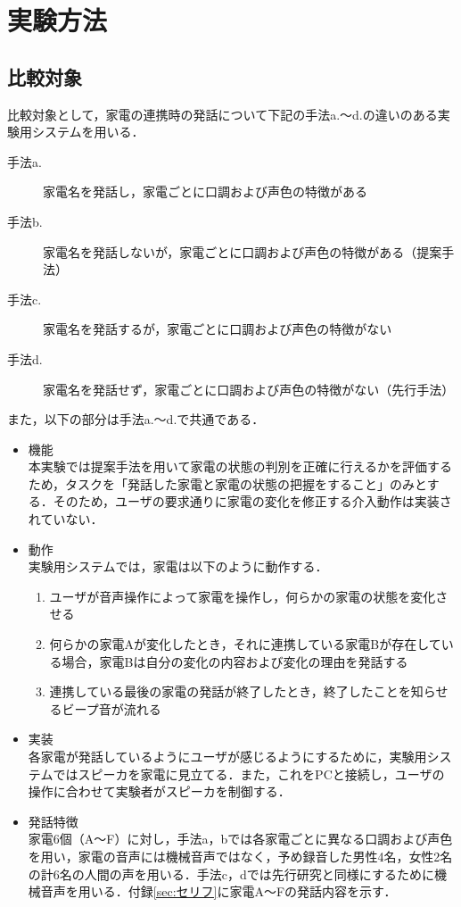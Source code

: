 \documentclass[a4j,12pt,twoside]{jreport}
\begin{document}
\section{実験方法}
\subsection{比較対象}
比較対象として，家電の連携時の発話について下記の手法a.〜d.の違いのある実験用システムを用いる．
\begin{description}
	\item[手法a.] 家電名を発話し，家電ごとに口調および声色の特徴がある
	\item[手法b.] 家電名を発話しないが，家電ごとに口調および声色の特徴がある（提案手法）
	\item[手法c.] 家電名を発話するが，家電ごとに口調および声色の特徴がない
	\item[手法d.] 家電名を発話せず，家電ごとに口調および声色の特徴がない（先行手法）
\end{description}
また，以下の部分は手法a.〜d.で共通である．
\begin{itemize}
	\item 機能\\
	本実験では提案手法を用いて家電の状態の判別を正確に行えるかを評価するため，タスクを「発話した家電と家電の状態の把握をすること」のみとする．そのため，ユーザの要求通りに家電の変化を修正する介入動作は実装されていない．
	\item 動作\\
	実験用システムでは，家電は以下のように動作する．
	\begin{enumerate}
		\item ユーザが音声操作によって家電を操作し，何らかの家電の状態を変化させる
		\item 何らかの家電Aが変化したとき，それに連携している家電Bが存在している場合，家電Bは自分の変化の内容および変化の理由を発話する
		\item 連携している最後の家電の発話が終了したとき，終了したことを知らせるビープ音が流れる
	\end{enumerate}
	\item 実装\\
	各家電が発話しているようにユーザが感じるようにするために，実験用システムではスピーカを家電に見立てる．また，これをPCと接続し，ユーザの操作に合わせて実験者がスピーカを制御する．
	\item 発話特徴\\
	家電6個（A〜F）に対し，手法a，bでは各家電ごとに異なる口調および声色を用い，家電の音声には機械音声ではなく，予め録音した男性4名，女性2名の計6名の人間の声を用いる．手法c，dでは先行研究と同様にするために機械音声を用いる．付録\ref{sec:セリフ}に家電A〜Fの発話内容を示す．
\end{itemize}
\end{document}
